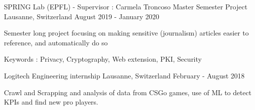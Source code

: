 \begin{cventries}
	\cventry
	{SPRING Lab (EPFL) - Supervisor : Carmela Troncoso} %
	{Master Semester Project} %
	{Lausanne, Switzerland} %
	{August 2019 - January 2020} %
	{ %
		\begin{cvitems}
			\item {Semester long project focusing on making sensitive (journalism) articles easier to reference, and automatically do so}
			\item {Keywords : Privacy, Cryptography, Web extension, PKI, Security}
		\end{cvitems}
	}
	
	
	
	\cventry
	{Logitech} %
	{Engineering internship} %
	{Lausanne, Switzerland} %
	{February - August 2018} %
	{ %
		\begin{cvitems}
			\item {Crawl and Scrapping and analysis of data from CSGo games, use of ML to detect KPIs and find new pro players.}
		\end{cvitems}
	}
	
	
	
	
	
	
\end{cventries}